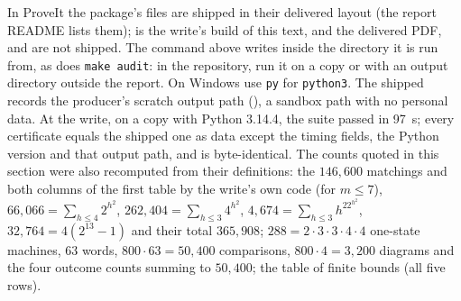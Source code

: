 \begin{writenote}
In ProveIt the package's files are shipped in their delivered layout (the
report README lists them);  is the write's build of this
text, and the delivered PDF,  and  are not
shipped. The command above writes  inside the directory it
is run from, as does \texttt{make audit}: in the repository, run it on a copy
or with an output directory outside the report. On Windows use \texttt{py}
for \texttt{python3}. The shipped 
records the producer's scratch output path
(), a sandbox path with no
personal data. At the write, on a copy with Python 3.14.4, the suite passed
in 97~s; every certificate equals the shipped one as data except the timing
fields, the Python version and that output path, and
 is byte-identical. The counts quoted in this
section were also recomputed from their definitions: the $146{,}600$
matchings and both columns of the first table by the write's own code (for
$m\le7$), $66{,}066=\sum_{h\le4}2^{h^2}$, $262{,}404=\sum_{h\le3}4^{h^2}$,
$4{,}674=\sum_{h\le3}h^22^{h^2}$, $32{,}764=4(2^{13}-1)$ and their total
$365{,}908$; $288=2\cdot3\cdot3\cdot4\cdot4$ one-state machines, $63$ words,
$800\cdot63=50{,}400$ comparisons, $800\cdot4=3{,}200$ diagrams and the four
outcome counts summing to $50{,}400$; the table of finite bounds (all five
rows).
\end{writenote}
